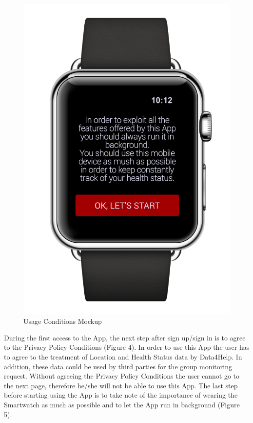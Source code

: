 \begin{enumerate}
\begin{figure}[H]
\begin{center}
\begin{minipage}[c]{.40\textwidth}
          \includegraphics[height=12 cm]{Images/Mockups/AutomatedSOSMockup4.png}
          \vspace{0.1cm}
          	\caption{Usage Conditions Mockup}
        \end{minipage}
      \end{center}
\end{figure}
During the first access to the App, the next step after sign up/sign in is to agree to the Privacy Policy Conditions (Figure 4). In order to use this App the user has to agree to the treatment of Location and Health Status data by Data4Help. In addition, these data could be used by third parties for the group monitoring request. Without agreeing the Privacy Policy Conditions the user cannot go to the next page, therefore he/she will not be able to use this App. The last step before starting using the App is to take note of the importance of wearing the Smartwatch as much as possible and to let the App run in background (Figure 5).
\clearpage
\begin{figure}
\begin{center}
	\bigbreak
        \begin{minipage}[c]{.40\textwidth}
        \centering

\end{minipage}
\end{center}
\end{figure}
\end{enumerate}
